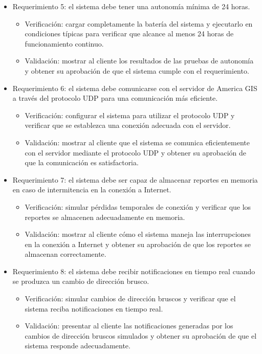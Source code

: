 \documentclass[
11pt, %
codirector, %
]{charter}
\begin{document}
\begin{itemize}
    \item Requerimiento 5: el sistema debe tener una autonomía mínima de 24 horas.
    \begin{itemize}    
    	\item Verificación: cargar completamente la batería del sistema y ejecutarlo en condiciones típicas para verificar que alcance al menos 24 horas de funcionamiento continuo.
    	\item Validación: mostrar al cliente los resultados de las pruebas de autonomía y obtener su aprobación de que el sistema cumple con el requerimiento.
    \end{itemize}

    \item Requerimiento 6: el sistema debe comunicarse con el servidor de America GIS a través del protocolo UDP para una comunicación más eficiente.
    \begin{itemize}    
    	\item Verificación: configurar el sistema para utilizar el protocolo UDP y verificar que se establezca una conexión adecuada con el servidor.
    	\item Validación: mostrar al cliente que el sistema se comunica eficientemente con el servidor mediante el protocolo UDP y obtener su aprobación de que la comunicación es satisfactoria.
    \end{itemize}

    \item Requerimiento 7: el sistema debe ser capaz de almacenar reportes en memoria en caso de intermitencia en la conexión a Internet.
    \begin{itemize}    
    	\item Verificación: simular pérdidas temporales de conexión y verificar que los reportes se almacenen adecuadamente en memoria.
    	\item Validación: mostrar al cliente cómo el sistema maneja las interrupciones en la conexión a Internet y obtener su aprobación de que los reportes se almacenan correctamente.
    \end{itemize}

    \item Requerimiento 8: el sistema debe recibir notificaciones en tiempo real cuando se produzca un cambio de dirección brusco.
    \begin{itemize}    
    	\item Verificación: simular cambios de dirección bruscos y verificar que el sistema reciba notificaciones en tiempo real.
    	\item Validación: presentar al cliente las notificaciones generadas por los cambios de dirección bruscos simulados y obtener su aprobación de que el sistema responde adecuadamente.
    \end{itemize}


\end{itemize}
\end{document}
